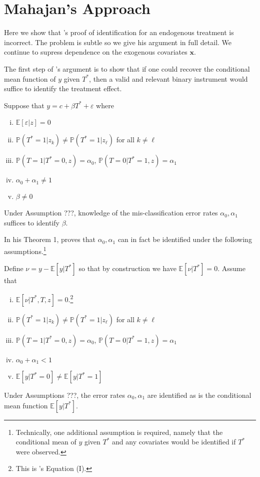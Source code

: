 \section{Mahajan's Approach}
\label{sec:mahajan}
Here we show that \citeauthor{Mahajan}'s proof of identification for an endogenous treatment is incorrect.
The problem is subtle so we give his argument in full detail.
We continue to supress dependence on the exogenous covariates $\mathbf{x}$.

The first step of \citeauthor{Mahajan}'s argument is to show that if one could recover the conditional mean function of $y$ given $T^*$, then a valid and relevant binary instrument would suffice to identify the treatment effect.  
\begin{assump}[Mahajan A2]\mbox{}
  Suppose that $y = c+ \beta T^* + \varepsilon$ where
  \begin{enumerate}[(i)]
    \item $\mathbb{E}[\varepsilon|z]=0$
    \item $\mathbb{P}(T^*=1|z_k)\neq \mathbb{P}(T^*=1|z_\ell)$ for all $k\neq \ell$
    \item $\mathbb{P}(T = 1| T^* = 0, z) = \alpha_0$, $\mathbb{P}(T = 0| T^* = 1, z) = \alpha_1$
    \item $\alpha_0 + \alpha_1 \neq 1$
    \item $\beta \neq 0$
  \end{enumerate}
\end{assump}

\begin{lem}[Mahajan A2]
Under Assumption ???, knowledge of the mis-classification error rates $\alpha_0, \alpha_1$ suffices to identify $\beta$.
\end{lem}

In his Theorem 1, \cite{Mahajan} proves that $\alpha_0, \alpha_1$ can in fact be identified under the following assumptions.\footnote{Technically, one additional assumption is required, namely that the conditional mean of $y$ given $T^*$ and any covariates would be identified if $T^*$ were observed.}
\begin{assump}[Mahajan A1] Define $\nu = y - \mathbb{E}[y|T^*]$ so that by construction we have $\mathbb{E}[\nu|T^*]=0$. Assume that
  \begin{enumerate}[(i)]
    \item $\mathbb{E}[\nu|T^*,T,z] = 0$.\footnote{This is \citeauthor{Mahajan}'s Equation (I).}
    \item $\mathbb{P}(T^*=1|z_k)\neq \mathbb{P}(T^*=1|z_\ell)$ for all $k\neq \ell$
    \item $\mathbb{P}(T = 1| T^* = 0, z) = \alpha_0$,  $\mathbb{P}(T = 0| T^* = 1, z) = \alpha_1$
    \item $\alpha_0 + \alpha_1 < 1$
    \item $\mathbb{E}[y|T^*=0]\neq \mathbb{E}[y|T^*=1]$
  \end{enumerate}
\end{assump}
\begin{lem}
  Under Assumptions ???, the error rates $\alpha_0, \alpha_1$ are identified as is the conditional mean function $\mathbb{E}[y|T^*]$.
\end{lem}

